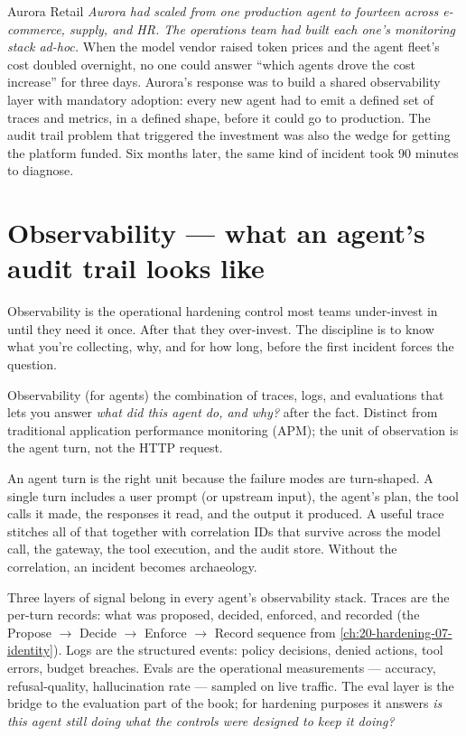 \begin{TNinpractice}{Aurora Retail}
\textit{Aurora had scaled from one production agent to fourteen across e-commerce, supply, and HR. The operations team had built each one's monitoring stack ad-hoc.} When the model vendor raised token prices and the agent fleet's cost doubled overnight, no one could answer ``which agents drove the cost increase'' for three days. Aurora's response was to build a shared observability layer with mandatory adoption: every new agent had to emit a defined set of traces and metrics, in a defined shape, before it could go to production. The audit trail problem that triggered the investment was also the wedge for getting the platform funded. Six months later, the same kind of incident took 90 minutes to diagnose.
\end{TNinpractice}

\section{Observability --- what an agent's audit trail looks like}

Observability is the operational hardening control most teams under-invest in until they need it once. After that they over-invest. The discipline is to know what you're collecting, why, and for how long, before the first incident forces the question.

\begin{TNdefinition}{Observability (for agents)}
the combination of traces, logs, and evaluations that lets you answer \textit{what did this agent do, and why?} after the fact. Distinct from traditional application performance monitoring (APM); the unit of observation is the agent turn, not the HTTP request.
\end{TNdefinition}

An agent turn is the right unit because the failure modes are turn-shaped. A single turn includes a user prompt (or upstream input), the agent's plan, the tool calls it made, the responses it read, and the output it produced. A useful trace stitches all of that together with correlation IDs that survive across the model call, the gateway, the tool execution, and the audit store. Without the correlation, an incident becomes archaeology.

Three layers of signal belong in every agent's observability stack. Traces are the per-turn records: what was proposed, decided, enforced, and recorded (the Propose $\rightarrow$ Decide $\rightarrow$ Enforce $\rightarrow$ Record sequence from \autoref{ch:20-hardening-07-identity}). Logs are the structured events: policy decisions, denied actions, tool errors, budget breaches. Evals are the operational measurements --- accuracy, refusal-quality, hallucination rate --- sampled on live traffic. The eval layer is the bridge to the evaluation part of the book; for hardening purposes it answers \textit{is this agent still doing what the controls were designed to keep it doing?}

